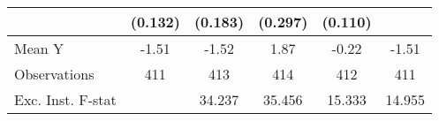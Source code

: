 {\begin{tabular}{l*{5}{c}}
            &     (0.132)         &     (0.183)         &     (0.297)         &     (0.110)         &                     \\
\midrule
Mean Y      &       -1.51         &       -1.52         &        1.87         &       -0.22         &       -1.51         \\
Observations&         411         &         413         &         414         &         412         &         411         \\
Exc. Inst. F-stat&                     &      34.237         &      35.456         &      15.333         &      14.955         \\
\bottomrule
\end{tabular}
}
